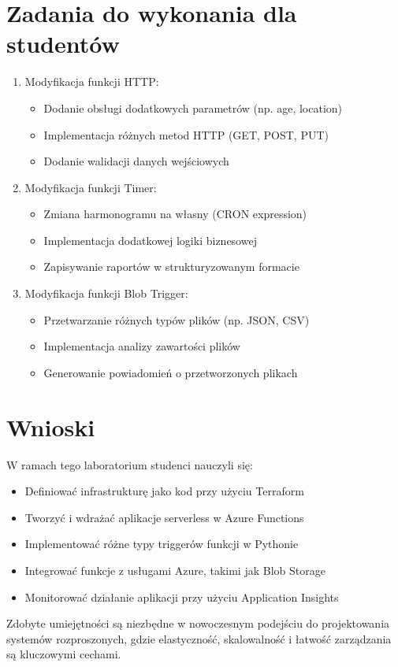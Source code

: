 \documentclass{article}
\begin{document}
\section{Zadania do wykonania dla studentów}

\begin{enumerate}
    \item Modyfikacja funkcji HTTP:
    \begin{itemize}
        \item Dodanie obsługi dodatkowych parametrów (np. age, location)
        \item Implementacja różnych metod HTTP (GET, POST, PUT)
        \item Dodanie walidacji danych wejściowych
    \end{itemize}
    
    \item Modyfikacja funkcji Timer:
    \begin{itemize}
        \item Zmiana harmonogramu na własny (CRON expression)
        \item Implementacja dodatkowej logiki biznesowej
        \item Zapisywanie raportów w strukturyzowanym formacie
    \end{itemize}
    
    \item Modyfikacja funkcji Blob Trigger:
    \begin{itemize}
        \item Przetwarzanie różnych typów plików (np. JSON, CSV)
        \item Implementacja analizy zawartości plików
        \item Generowanie powiadomień o przetworzonych plikach
    \end{itemize}
\end{enumerate}

\section{Wnioski}

W ramach tego laboratorium studenci nauczyli się:

\begin{itemize}
    \item Definiować infrastrukturę jako kod przy użyciu Terraform
    \item Tworzyć i wdrażać aplikacje serverless w Azure Functions
    \item Implementować różne typy triggerów funkcji w Pythonie
    \item Integrować funkcje z usługami Azure, takimi jak Blob Storage
    \item Monitorować działanie aplikacji przy użyciu Application Insights
\end{itemize}

Zdobyte umiejętności są niezbędne w nowoczesnym podejściu do projektowania systemów rozproszonych, gdzie elastyczność, skalowalność i łatwość zarządzania są kluczowymi cechami.
\end{document}

